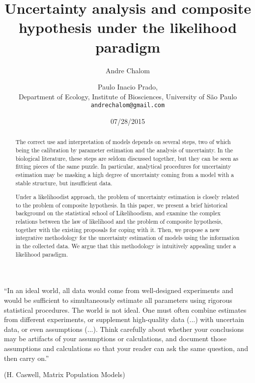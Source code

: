 \documentclass[twoside,12pt,a4paper]{article}
\begin{document}

\title{Uncertainty analysis and composite hypothesis under the likelihood paradigm}
\author{Andre Chalom \and Paulo Inacio Prado,\\ 
  Department of Ecology, Institute of Biosciences, University of São Paulo \\
  \texttt{andrechalom@gmail.com}
  }
\date{07/28/2015}
\maketitle

\begin{abstract}
  The correct use and interpretation of models depends on several steps, two of which being the
  calibration by parameter estimation and the analysis of uncertainty. In the biological literature,
  these steps are seldom discussed together, but they can be seen as fitting pieces of the same puzzle.
  In particular, analytical procedures for uncertainty estimation may be masking a high degree of 
  uncertainty coming from a model with a stable structure, but insufficient data. 
  
  Under a likelihoodist approach, the problem of uncertainty estimation is closely related to the problem
  of composite hypothesis. In this paper, we present a brief historical background on the statistical 
  school of Likelihoodism, and examine the complex relations between the law of likelihood and the 
  problem of composite hypothesis, together with the existing proposals for coping with it. Then, we
  propose a new integrative methodology for the uncertainty estimation of models using the information
  in the collected data. We argue that this methodology is intuitively appealing under a likelihood 
  paradigm. 
\end{abstract}

\newpage
\vfill
\noindent
``In an ideal world, all data would come from well-designed experiments
and would be sufficient to simultaneously estimate all parameters using rigorous
statistical procedures. The world is not ideal. One must often combine estimates
from different experiments, or supplement high-quality data (...) with uncertain
data, or even assumptions (...). Think carefully about whether your conclusions
may be artifacts of your assumptions or calculations, and document those assumptions
and calculations so that your reader can ask the same question, and then carry on.''
\begin{flushright}
(H. Caswell, Matrix Population Models)
\end{flushright}
\vfill
\indent
\newpage
\tableofcontents
\newpage
\end{document}
